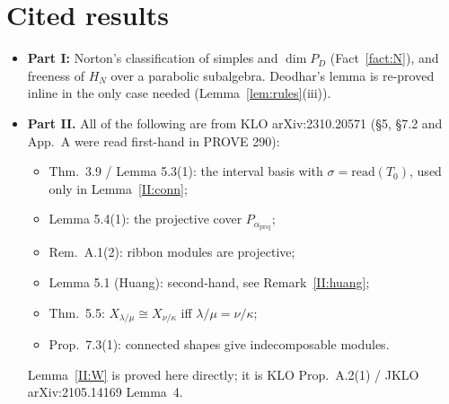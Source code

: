 \documentclass[11pt]{amsart}
\theoremstyle{plain}
\theoremstyle{definition}
\begin{document}
\section{Cited results}\label{sec:cited}
\begin{itemize}[itemsep=2pt]
\item \textbf{Part I:} Norton's classification of simples and $\dim P_D$ (Fact~\ref{fact:N}), and freeness of $H_N$ over a parabolic subalgebra. Deodhar's lemma is re-proved inline in the only case needed (Lemma~\ref{lem:rules}(iii)).
\item \textbf{Part II.} All of the following are from KLO arXiv:2310.20571 (\S5, \S7.2 and App.~A were read first-hand in PROVE 290):
\begin{itemize}[itemsep=1pt]
\item Thm.~3.9 / Lemma 5.3(1): the interval basis with $\sigma=\mathrm{read}(T_0)$, used only in Lemma~\ref{II:conn};
\item Lemma 5.4(1): the projective cover $P_{\alpha_{\mathrm{proj}}}$;
\item Rem.~A.1(2): ribbon modules are projective;
\item Lemma 5.1 (Huang): second-hand, see Remark~\ref{II:huang};
\item Thm.~5.5: $X_{\lambda/\mu}\cong X_{\nu/\kappa}$ iff $\lambda/\mu=\nu/\kappa$;
\item Prop.~7.3(1): connected shapes give indecomposable modules.
\end{itemize}
Lemma~\ref{II:W} is proved here directly; it is KLO Prop.~A.2(1) / JKLO arXiv:2105.14169 Lemma~4.
\end{itemize}
\end{document}
